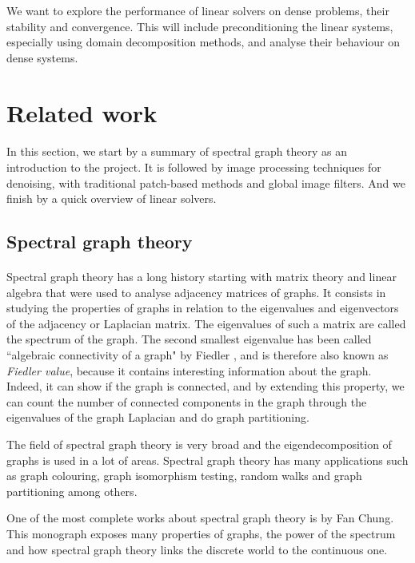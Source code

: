We want to explore the performance of linear solvers on dense problems, their stability and convergence.
This will include preconditioning the linear systems, especially using domain decomposition methods, and analyse their behaviour on dense systems.

\section{Related work}

\paragraph{}
In this section, we start by a summary of spectral graph theory as an introduction to the project.
It is followed by image processing techniques for denoising, with traditional patch-based methods and global image filters.
And we finish by a quick overview of linear solvers.

\subsection{Spectral graph theory}

\paragraph{}
Spectral graph theory has a long history starting with matrix theory and linear algebra that were used to analyse adjacency matrices of graphs.
It consists in studying the properties of graphs in relation to the eigenvalues and eigenvectors of the adjacency or Laplacian matrix.
The eigenvalues of such a matrix are called the spectrum of the graph.
The second smallest eigenvalue has been called ``algebraic connectivity of a graph" by Fiedler \cite{fiedler_algebraic_1973}, and is therefore also known as \textit{Fiedler value}, because it contains interesting information about the graph.
Indeed, it can show if the graph is connected, and by extending this property, we can count the number of connected components in the graph through the eigenvalues of the graph Laplacian and do graph partitioning.

The field of spectral graph theory is very broad and the eigendecomposition of graphs is used in a lot of areas.
Spectral graph theory has many applications such as graph colouring, graph isomorphism testing, random walks and graph partitioning among others.

One of the most complete works about spectral graph theory is \cite{chung_spectral_1997} by Fan Chung.
This monograph exposes many properties of graphs, the power of the spectrum and how spectral graph theory links the discrete world to the continuous one.

